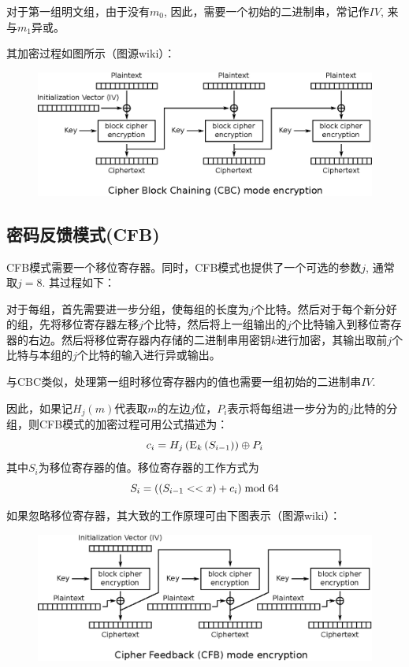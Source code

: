 对于第一组明文组，由于没有$m_0$, 因此，需要一个初始的二进制串，常记作$IV$, 来与$m_1$异或。\par
其加密过程如图所示（图源wiki）：
\begin{figure}[H]
\centering
\includegraphics[scale=1]{chapters/chapter_4/CBC.eps}
\end{figure}
\subsection{密码反馈模式(CFB)}
CFB模式需要一个移位寄存器。同时，CFB模式也提供了一个可选的参数$j$, 通常取$j=8$. 其过程如下：\par
对于每组，首先需要进一步分组，使每组的长度为$j$个比特。然后对于每个新分好的组，先将移位寄存器左移$j$个比特，然后将上一组输出的$j$个比特输入到移位寄存器的右边。然后将移位寄存器内存储的二进制串用密钥$k$进行加密，其输出取前$j$个比特与本组的$j$个比特的输入进行异或输出。\par
与CBC类似，处理第一组时移位寄存器内的值也需要一组初始的二进制串$IV$.\par
因此，如果记$H_j(m)$代表取$m$的左边$j$位，$P_i$表示将每组进一步分为的$j$比特的分组，则CFB模式的加密过程可用公式描述为：
\begin{equation}
c_i=H_j\left( {{\mathrm{E}_{k}\left({S_{i-1}}\right)}}\right)\oplus P_i
\end{equation}
其中$S_i$为移位寄存器的值。移位寄存器的工作方式为
\begin{equation}
S_i=\left( {\left( {S_{i-1} << x}\right)+c_i}\right)\bmod{64}
\end{equation}

如果忽略移位寄存器，其大致的工作原理可由下图表示（图源wiki）：
\begin{figure}[H]
\centering
\includegraphics[scale=1]{chapters/chapter_4/CFB.eps}
\end{figure}
